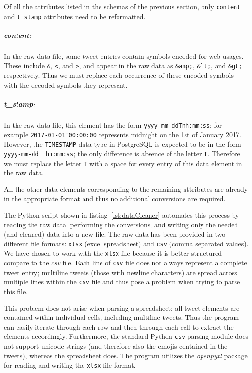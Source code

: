 \documentclass[a4paper, 12pt]{report}
\begin{document}
Of all the attributes listed in the schemas of the previous section, only \texttt{content} and \texttt{t\_stamp} attributes need to be reformatted.

\subparagraph{content:} In the raw data file, some tweet entries contain symbols encoded for web usages. These include \texttt{\&}, \texttt{<}, and \texttt{>}, and appear in the raw data as \texttt{\&amp;}, \texttt{\&lt;}, and \texttt{\&gt;} respectively. Thus we must replace each occurrence of these encoded symbols with the decoded symbols they represent.

\subparagraph{t\_stamp:} In the raw data file, this element has the form \texttt{yyyy-mm-ddThh:mm:ss}; for example \texttt{2017-01-01T00:00:00} represents midnight on the 1st of January 2017. However, the \texttt{TIMESTAMP} data type in PostgreSQL is expected to be in the form \texttt{yyyy-mm-dd~ hh:mm:ss}; the only difference is absence of the letter \texttt{T}. Therefore we must replace the letter \texttt{T} with a space for every entry of this data element in the raw data.

All the other data elements corresponding to the remaining attributes are already in the appropriate format and thus no additional conversions are required.

The Python script shown in listing~\ref{lst:dataCleaner} automates this process by reading the raw data, performing the conversions, and writing only the needed (and cleaned) data into a new file. The raw data has been provided in two different file formats: \texttt{xlsx} (excel spreadsheet) and \texttt{csv} (comma separated values). We have chosen to work with the \texttt{xlsx} file because it is better structured compare to the \textit{csv} file. Each line of \texttt{csv} file does not always represent a complete tweet entry; multiline tweets (those with newline characters) are spread across multiple lines within the \texttt{csv} file and thus pose a problem when trying to parse this file.

This problem does not arise when parsing a spreadsheet; all tweet elements are contained within individual cells, including multiline tweets. Thus the program can easily iterate through each row and then through each cell to extract the elements accordingly. Furthermore, the standard Python \texttt{csv} parsing module does not support unicode strings (and therefore also the emojis contained in the tweets), whereas the spreadsheet does. The program utilizes the \textit{openpyxl} package for reading and writing the \texttt{xlsx} file format.
\end{document}
